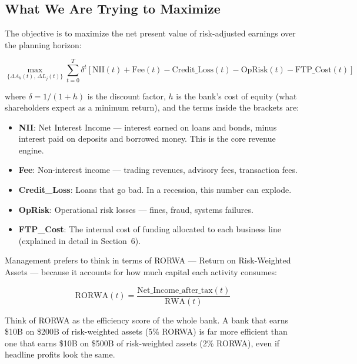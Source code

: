 \documentclass[12pt,a4paper]{article}
\begin{document}
\subsection{What We Are Trying to Maximize}

The objective is to maximize the net present value of risk-adjusted earnings
over the planning horizon:

\begin{equation}
  \max_{\{\Delta A_k(t),\, \Delta L_j(t)\}}
  \sum_{t=0}^{T} \delta^t \left[
    \text{NII}(t) + \text{Fee}(t) - \text{Credit\_Loss}(t)
    - \text{OpRisk}(t) - \text{FTP\_Cost}(t)
  \right]
\end{equation}

where $\delta = 1/(1+h)$ is the discount factor, $h$ is the bank's cost of
equity (what shareholders expect as a minimum return), and the terms inside
the brackets are:
\begin{itemize}[noitemsep]
  \item \textbf{NII}: Net Interest Income --- interest earned on loans and
        bonds, minus interest paid on deposits and borrowed money.
        This is the core revenue engine.
  \item \textbf{Fee}: Non-interest income --- trading revenues, advisory
        fees, transaction fees.
  \item \textbf{Credit\_Loss}: Loans that go bad.  In a recession, this
        number can explode.
  \item \textbf{OpRisk}: Operational risk losses --- fines, fraud, systems
        failures.
  \item \textbf{FTP\_Cost}: The internal cost of funding allocated to each
        business line (explained in detail in Section~6).
\end{itemize}

Management prefers to think in terms of RORWA --- Return on Risk-Weighted
Assets --- because it accounts for how much capital each activity consumes:

\begin{equation}
  \text{RORWA}(t) = \frac{\text{Net\_Income\_after\_tax}(t)}{\text{RWA}(t)}
\end{equation}

\begin{mdframed}[style=analogy]
Think of RORWA as the efficiency score of the whole bank.  A bank that earns
\$10B on \$200B of risk-weighted assets (5\% RORWA) is far more efficient
than one that earns \$10B on \$500B of risk-weighted assets (2\% RORWA),
even if headline profits look the same.
\end{mdframed}
\end{document}
